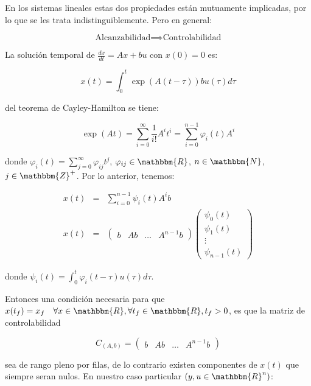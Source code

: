 En los sistemas lineales estas dos propiedades están mutuamente implicadas, por lo que se les trata indistinguiblemente. Pero en general:

\begin{equation}
\text{Alcanzabilidad} \implies \text{Controlabilidad}
\end{equation}

La solución temporal de $\frac{dx}{dt} = Ax + bu$ con $x(0) = 0$ es:

\begin{equation}
x(t) = \int_0^t \exp{(A(t - \tau))} b u(\tau) d \tau
\end{equation}

del teorema de Cayley-Hamilton se tiene:

\begin{equation}
\exp{(A t)} = \sum\limits_{i=0}^{\infty} \frac{1}{i!} A^i t^i = \sum\limits_{i=0}^{n-1} \varphi_i(t) A^i
\end{equation}

donde $\varphi_i(t) = \sum\limits_{j=0}^{\infty} \varphi_{ij} t^j$, $\varphi_{ij} \in \mathbbm{R}$, $n \in \mathbbm{N}$, $j \in \mathbbm{Z}^+$. Por lo anterior, tenemos:

\begin{eqnarray}
x(t) & = & \sum\limits_{i=0}^{n-1} \psi_i(t) A^i b \nonumber \\
x(t) & = &
\begin{pmatrix}
b & A b & \dots & A^{n-1} b
\end{pmatrix}
\begin{pmatrix}
\psi_0(t) \\
\psi_1(t) \\
\vdots \\
\psi_{n-1}(t)
\end{pmatrix}
\end{eqnarray}

donde $\psi_i(t) = \int_0^t \varphi_i (t - \tau) u(\tau) d \tau$.

Entonces una condición necesaria para que $x(t_f) = x_f \quad \forall x \in \mathbbm{R}, \forall t_f \in \mathbbm{R}, t_f > 0$, es que la matriz de controlabilidad

\begin{equation}
C_{(A,b)} =
\begin{pmatrix}
b & Ab & \dots & A^{n-1}b
\end{pmatrix}
\end{equation}

sea de rango pleno por filas, de lo contrario existen componentes de $x(t)$ que siempre seran nulos. En nuestro caso particular $\left( y, u \in \mathbbm{R}^n \right)$:

